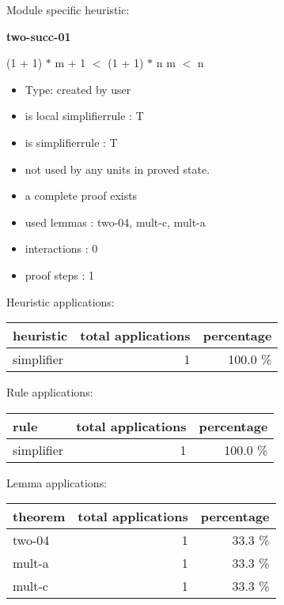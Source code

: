 \documentclass[a4paper]{article}
\begin{document}
Module specific heuristic:

\pagebreak

{\LARGE\bf two-succ-01}\label{lemma-two-succ-01}

\medskip

 \Fol (1 + 1) $*$ m + 1 $<$ (1 + 1) $*$ n \Equiv m $<$ n

\begin{itemize}

\item Type: created by user

\item is local simplifierrule : T
\item is simplifierrule : T
\item not used by any units in proved state.
\item       a complete proof exists
\item       used lemmas  : two-04, mult-c, mult-a
\item       interactions : 0
\item       proof steps  : 1
\end{itemize}

\medskip


Heuristic applications:

\begin{supertabular}{l|r|r}
heuristic	& total applications & percentage \\ \hline
simplifier & 1 & 100.0 \% \\

\end{supertabular}

Rule applications:

\begin{supertabular}{l|r|r}
rule	        & total applications & percentage \\ \hline
simplifier & 1 & 100.0 \% \\

\end{supertabular}

Lemma applications:

\begin{supertabular}{l|r|r}
theorem	        & total applications & percentage \\ \hline
two-04 & 1 & 33.3 \% \\
mult-a & 1 & 33.3 \% \\
mult-c & 1 & 33.3 \% \\

\end{supertabular}
\end{document}
